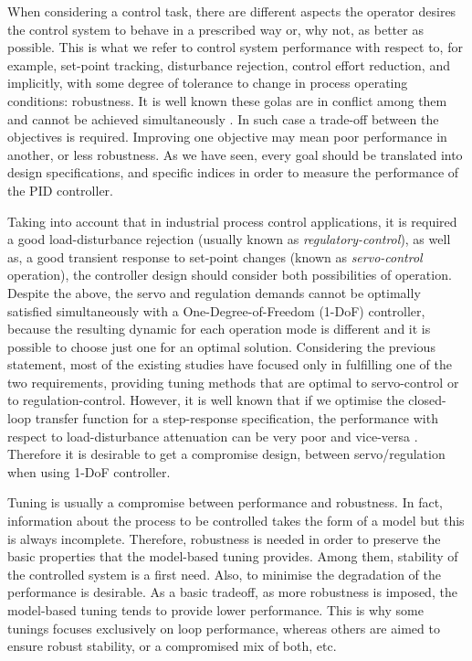 When considering a control task, there are different aspects the operator desires the control system to behave in a prescribed way or, why not, as better as possible. This is what we refer to control system performance with respect to, for example, set-point tracking, disturbance rejection, control effort reduction, and implicitly, with some degree of tolerance to change in process operating conditions: robustness. It is well known these golas are in conflict among them and cannot be achieved simultaneously \cite{Arrieta2010,alcantara2013} . In such case a trade-off between the objectives is required. Improving one objective may mean poor performance in another, or less robustness. As we have seen, every goal should be translated into design specifications, and specific indices in order to  measure the performance of the PID controller.

Taking into account that in industrial process control applications, it is required a good load-disturbance rejection (usually known as \emph{regulatory-control}), as well as, a good transient response to set-point changes (known as \emph{servo-control} operation), the controller design should consider both possibilities of operation. Despite the above, the servo and regulation demands cannot be optimally satisfied simultaneously with a One-Degree-of-Freedom (1-DoF) controller, because the resulting dynamic for each operation mode is different and it is possible to choose just one for an optimal solution. Considering the previous statement, most of the existing studies have focused only in fulfilling one of the two requirements, providing tuning methods that are optimal to servo-control or to regulation-control. However, it is well known that if we optimise the closed-loop transfer function for a step-response specification, the performance with respect to load-disturbance attenuation can be very poor and vice-versa \cite{Arrieta2010a}. Therefore it is desirable to get a compromise design, between servo/regulation when using 1-DoF controller.

Tuning is usually a compromise between performance and robustness. In fact, information about the process to be controlled takes the form of a model but this is always incomplete. Therefore, robustness is needed in order to preserve the basic properties that the model-based tuning provides. Among them, stability of the controlled system is a first need. Also, to minimise the degradation of the performance is desirable. As a basic tradeoff, as more robustness is imposed, the model-based tuning tends to provide lower performance. This is why some tunings focuses exclusively on loop performance, whereas others are aimed to ensure robust stability, or a compromised mix of both, etc. 


